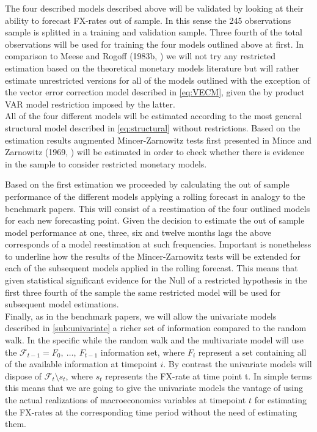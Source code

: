 The four described models described above will be validated by looking at their ability to
forecast FX-rates out of sample. In this sense the 245 observations sample is splitted in
a training and validation sample. Three fourth of the total observations will be used for
training the four models outlined above at first. In comparison to Meese and Rogoff
(1983b, \cite{MeeseRogoffb}) we will not try any restricted estimation based on the theoretical
monetary models literature but will rather estimate unrestricted versions for all of the models
outlined with the exception of the vector error correction model described in \ref{eq:VECM}, given
the by product VAR model restriction imposed by the latter.\\
All of the four different models will be estimated according to the most general structural model
described in \ref{eq:structural} without restrictions. Based on the estimation results augmented
Mincer-Zarnowitz tests first presented in Mince and Zarnowitz (1969, \cite{MincerZarnowitz})
will be estimated in order to check whether there is evidence in the sample to consider
restricted monetary models. 

Based on the first estimation we proceeded by calculating the out of sample performance of the
different models applying a rolling forecast in analogy to the benchmark papers. This will consist
of a reestimation of the four outlined models for each new forecasting point. Given the decision
to estimate the out of sample model performance at one, three, six and twelve months lags the above
corresponds of a model reestimation at such frequencies. Important is nonetheless to underline how
the results of the Mincer-Zarnowitz tests will be extended for each of the subsequent models applied
in the rolling forecast. This means that given statistical significant evidence for the Null of a
restricted hypothesis in the first three fourth of the sample the same restricted model will be used for
subsequent model estimations. \\
Finally, as in the benchmark papers, we will allow the univariate models
described in \ref{sub:univariate} a richer set of information compared to the random walk.
In the specific while the random walk and the multivariate model will use the $\mathscr{F}_{t-1} = {F_0, \ \dots, \ F_{t-1}}$
information set, where $F_i$ represent a set containing all of the available information at timepoint $i$.
By contrast the univariate models will dispose of $\mathscr{F}_t \setminus s_t$, where $s_t$ represents
the FX-rate at time point t.
In simple terms this means that we are going to give the univariate models the vantage of using the actual realizations of
macroeconomics variables at timepoint $t$ for estimating the FX-rates at the corresponding time period without the need
of estimating them.

